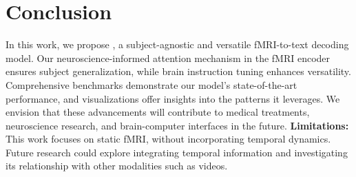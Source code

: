 \section{Conclusion}
In this work, we propose \name{}, a subject-agnostic and versatile fMRI-to-text decoding model. Our neuroscience-informed attention mechanism in the fMRI encoder ensures subject generalization, while brain instruction tuning enhances versatility. Comprehensive benchmarks demonstrate our model's state-of-the-art performance, and visualizations offer insights into the patterns it leverages. We envision that these advancements will contribute to medical treatments, neuroscience research, and brain-computer interfaces in the future. \noindent\textbf{Limitations:} This work focuses on static fMRI, without incorporating temporal dynamics. Future research could explore integrating temporal information and investigating its relationship with other modalities such as videos.%